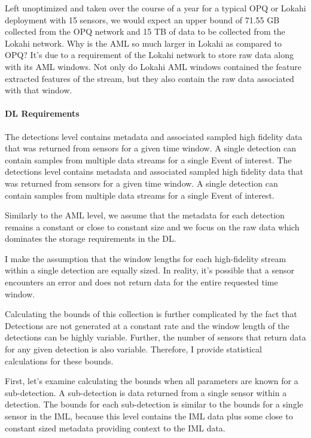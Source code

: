 Left unoptimized and taken over the course of a year for a typical OPQ or Lokahi deployment with 15 sensors, we would expect an upper bound of 71.55 GB collected from the OPQ network and 15 TB of data to be collected from the Lokahi network. Why is the AML so much larger in Lokahi as compared to OPQ? It's due to a requirement of the Lokahi network to store raw data along with its AML windows. Not only do Lokahi AML windows contained the feature extracted features of the stream, but they also contain the raw data associated with that window.

\paragraph{DL Requirements}
The detections level contains metadata and associated sampled high fidelity data that was returned from sensors for a given time window. A single detection can contain samples from multiple data streams for a single Event of interest.
The detections level contains metadata and associated sampled high fidelity data that was returned from sensors for a given time window. A single detection can contain samples from multiple data streams for a single Event of interest.

Similarly to the AML level, we assume that the metadata for each detection remains a constant or close to constant size and we focus on the raw data which dominates the storage requirements in the DL\@.

I make the assumption that the window lengths for each high-fidelity stream within a single detection are equally sized. In reality, it's possible that a sensor encounters an error and does not return data for the entire requested time window.

Calculating the bounds of this collection is further complicated by the fact that Detections are not generated at a constant rate and the window length of the detections can be highly variable. Further, the number of sensors that return data for any given detection is also variable. Therefore, I provide statistical calculations for these bounds.

First, let's examine calculating the bounds when all parameters are known for a sub-detection. A sub-detection is data returned from a single sensor within a detection. The bounds for each sub-detection is similar to the bounds for a single sensor in the IML, because this level contains the IML data plus some close to constant sized metadata providing context to the IML data.

